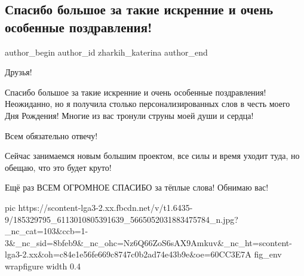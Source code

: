  
 
 
 
 
 
\subsection{Спасибо большое за такие искренние и очень особенные поздравления!}
\label{sec:11_05_2021.fb.zharkih_katerina.1.spasibo_za_pozdravlenija}
\ifcmt
 author_begin
   author_id zharkih_katerina
 author_end
\fi

Друзья! 

Спасибо большое за такие искренние и очень особенные поздравления! Неожиданно,
но я получила столько персонализированных слов в честь моего Дня Рождения!
Многие из вас тронули струны моей души и сердца!

Всем обязательно отвечу! 

Сейчас занимаемся новым большим проектом, все силы и время уходит туда, но
обещаю, что это будет круто! 

Ещё раз ВСЕМ ОГРОМНОЕ СПАСИБО за тёплые слова! Обнимаю вас!

\ifcmt
  pic https://scontent-lga3-2.xx.fbcdn.net/v/t1.6435-9/185329795_6113010805391639_5665052031883475784_n.jpg?_nc_cat=103&ccb=1-3&_nc_sid=8bfeb9&_nc_ohc=Nz6Q66ZoS6sAX9Amkuv&_nc_ht=scontent-lga3-2.xx&oh=c84e1e56fe669c8747c0b2ad74e43b9e&oe=60CC3E7A
	fig_env wrapfigure
	width 0.4
\fi

